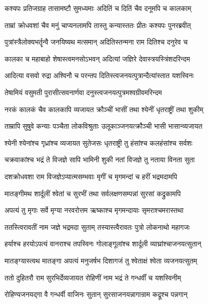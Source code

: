 \twolineshloka
{कश्यपः प्रतिजग्राह तासामष्टौ सुमध्यमाः}
{अदितिं च दितिं चैव दनूमपि च कालकाम्} %

\twolineshloka
{ताम्रां क्रोधवशां चैव मनुं चाप्यनलामपि}
{तास्तु कन्यास्ततः प्रीतः कश्यपः पुनरब्रवीत्} %

\twolineshloka
{पुत्रांस्त्रैलोक्यभर्तॄन्वै जनयिष्यथ मत्समान्}
{अदितिस्तन्मना राम दितिश्च दनुरेव च} %

\twolineshloka
{कालका च महाबाहो शेषास्त्वमनसोऽभवन्}
{अदित्यां जज्ञिरे देवास्त्रयस्त्रिंशदरिन्दम} %

\twolineshloka
{आदित्या वसवो रुद्रा अश्विनौ च परन्तप}
{दितिस्त्वजनयत्पुत्रान्दैत्यांस्तात यशस्विनः} %

\twolineshloka
{तेषामियं वसुमती पुरासीत्सवनार्णवा}
{दनुस्त्वजनयत्पुत्रमश्वग्रीवमरिन्दम} %

\twolineshloka
{नरकं कालकं चैव कालकापि व्यजायत}
{क्रौञ्चीं भासीं तथा श्येनीं धृतराष्ट्रीं तथा शुकीम्} %

\twolineshloka
{ताम्रापि सुषुवे कन्याः पञ्चैता लोकविश्रुताः}
{उलूकाञ्जनयत्क्रौञ्ची भासी भासान्व्यजायत} %

\twolineshloka
{श्येनी श्येनांश्च गृध्रांश्च व्यजायत सुतेजसः}
{धृतराष्ट्री तु हंसांश्च कलहंसांश्च सर्वशः} %

\twolineshloka
{चक्रवाकांश्च भद्रं ते विजज्ञे सापि भामिनी}
{शुकी नतां विजज्ञे तु नताया विनता सुता} %

\twolineshloka
{दशक्रोधवशा राम विजज्ञेऽप्यात्मसम्भवाः}
{मृगीं च मृगमन्दां च हरीं भद्रमदामपि} %

\twolineshloka
{मातङ्गीमथ शार्दूलीं श्वेतां च सुरभीं तथा}
{सर्वलक्षणसम्पन्नां सुरसां कद्रुकामपि} %

\twolineshloka
{अपत्यं तु मृगाः सर्वे मृग्या नरवरोत्तम}
{ऋष्काश्च मृगमन्दायाः सृमराश्चमरास्तथा} %

\twolineshloka
{ततस्त्विरावतीं नाम जज्ञे भद्रमदा सुताम्}
{तस्यास्त्वैरावतः पुत्रो लोकनाथो महागजः} %

\twolineshloka
{हर्याश्च हरयोऽपत्यं वानराश्च तपस्विनः}
{गोलाङ्गूलांश्च शार्दूली व्याघ्रांश्चाजनयत्सुतान्} %

\twolineshloka
{मातङ्ग्यास्त्वथ मातङ्गा अपत्यं मनुजर्षभ}
{दिशागजं तु श्वेताक्षं श्वेता व्यजनयत्सुतम्} %

\twolineshloka
{ततो दुहितरौ राम सुरभिर्देव्यजायत}
{रोहिणीं नाम भद्रं ते गन्धर्वीं च यशस्विनीम्} %

\twolineshloka
{रोहिण्यजनयद्गा वै गन्धर्वी वाजिनः सुतान्}
{सुरसाजनयन्नागान्राम कद्रूश्च पन्नगान्} %

